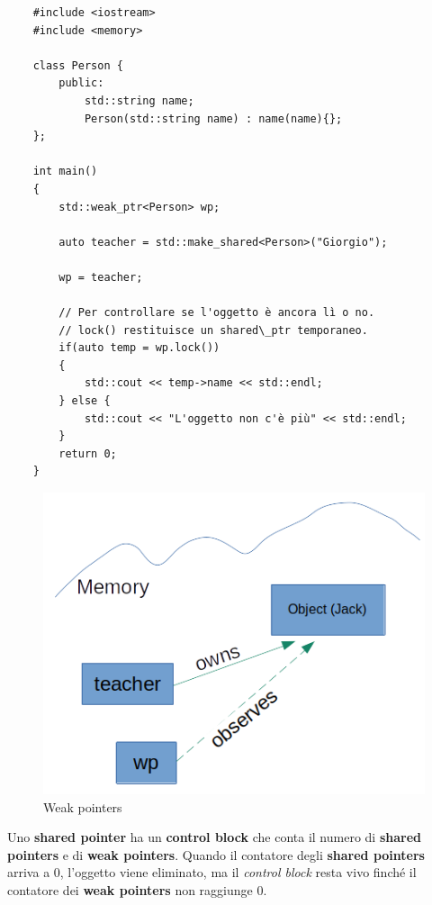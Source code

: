 \begin{lstlisting}
	#include <iostream>
	#include <memory>
	
	class Person {
		public:
			std::string name;
			Person(std::string name) : name(name){};
	};
	
	int main()
	{
		std::weak_ptr<Person> wp;
		
		auto teacher = std::make_shared<Person>("Giorgio");
		
		wp = teacher;
		
		// Per controllare se l'oggetto è ancora lì o no.
		// lock() restituisce un shared\_ptr temporaneo.
		if(auto temp = wp.lock())
		{
			std::cout << temp->name << std::endl;
		} else {
			std::cout << "L'oggetto non c'è più" << std::endl;
		}
		return 0;
	}
\end{lstlisting}

\newpage %

\begin{figure}[H]
	\centering
	\includegraphics[width=1\textwidth, height=1\textheight, keepaspectratio]{./imgs/weak_ptr1.png}
	\caption{Weak pointers}
	\label{fig:weak_ptr1}
\end{figure}

\textsf{\small Uno \textbf{shared pointer} ha un \textbf{control block} che conta il numero di \textbf{shared pointers} e di \textbf{weak pointers}. Quando il contatore degli \textbf{shared pointers} arriva a 0, l'oggetto viene eliminato, ma il \emph{control block} resta vivo finché il contatore dei \textbf{weak pointers} non raggiunge 0.} \\

